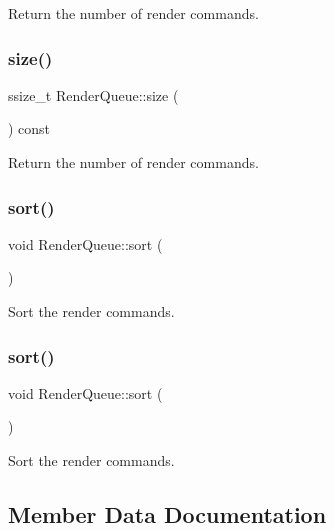 Return the number of render commands. \mbox{\label{classRenderQueue_aadadee1f1d53d85fa2d91cad921652e4}} 
\subsubsection{\texorpdfstring{size()}{size()}\hspace{0.1cm}{\footnotesize\ttfamily [2/2]}}
{\footnotesize\ttfamily ssize\+\_\+t Render\+Queue\+::size (\begin{DoxyParamCaption}{ }\end{DoxyParamCaption}) const}

Return the number of render commands. \mbox{\label{classRenderQueue_a5dce2ab80620ec15c36ccdf2da1fd87a}} 
\subsubsection{\texorpdfstring{sort()}{sort()}\hspace{0.1cm}{\footnotesize\ttfamily [1/2]}}
{\footnotesize\ttfamily void Render\+Queue\+::sort (\begin{DoxyParamCaption}{ }\end{DoxyParamCaption})}

Sort the render commands. \mbox{\label{classRenderQueue_a5dce2ab80620ec15c36ccdf2da1fd87a}} 
\subsubsection{\texorpdfstring{sort()}{sort()}\hspace{0.1cm}{\footnotesize\ttfamily [2/2]}}
{\footnotesize\ttfamily void Render\+Queue\+::sort (\begin{DoxyParamCaption}{ }\end{DoxyParamCaption})}

Sort the render commands. 

\subsection{Member Data Documentation}
\mbox{\label{classRenderQueue_ae188745e0ea9c53f8e4f5027d3f0ceb2}} 
